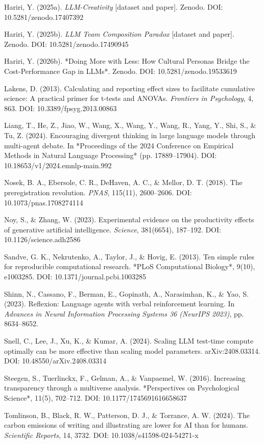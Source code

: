\documentclass[11pt,a4paper]{article}
\begin{document}
Hariri, Y. (2025a). \textit{LLM-Creativity} [dataset and paper]. Zenodo.
DOI: 10.5281/zenodo.17407392

Hariri, Y. (2025b). \textit{LLM Team Composition Paradox} [dataset and paper].
Zenodo. DOI: 10.5281/zenodo.17490945

Hariri, Y. (2026b). *Doing More with Less: How Cultural Personas Bridge the
Cost-Performance Gap in LLMs*. Zenodo. DOI: 10.5281/zenodo.19533619

Lakens, D. (2013). Calculating and reporting effect sizes to facilitate
cumulative science: A practical primer for t-tests and ANOVAs.
\textit{Frontiers in Psychology}, 4, 863.
DOI: 10.3389/fpsyg.2013.00863

Liang, T., He, Z., Jiao, W., Wang, X., Wang, Y., Wang, R., Yang, Y.,
Shi, S., \& Tu, Z. (2024). Encouraging divergent thinking in large language
models through multi-agent debate. In *Proceedings of the 2024 Conference on
Empirical Methods in Natural Language Processing* (pp. 17889–17904).
DOI: 10.18653/v1/2024.emnlp-main.992

Nosek, B. A., Ebersole, C. R., DeHaven, A. C., \& Mellor, D. T. (2018). The
preregistration revolution. \textit{PNAS}, 115(11), 2600–2606.
DOI: 10.1073/pnas.1708274114

Noy, S., \& Zhang, W. (2023). Experimental evidence on the productivity
effects of generative artificial intelligence. \textit{Science}, 381(6654),
187–192. DOI: 10.1126/science.adh2586

Sandve, G. K., Nekrutenko, A., Taylor, J., \& Hovig, E. (2013). Ten simple
rules for reproducible computational research. *PLoS Computational
Biology*, 9(10), e1003285. DOI: 10.1371/journal.pcbi.1003285

Shinn, N., Cassano, F., Berman, E., Gopinath, A., Narasimhan, K., \& Yao, S.
(2023). Reflexion: Language agents with verbal reinforcement learning.
In \textit{Advances in Neural Information Processing Systems 36 (NeurIPS 2023)},
pp. 8634–8652.

Snell, C., Lee, J., Xu, K., \& Kumar, A. (2024). Scaling LLM test-time
compute optimally can be more effective than scaling model parameters.
arXiv:2408.03314. DOI: 10.48550/arXiv.2408.03314

Steegen, S., Tuerlinckx, F., Gelman, A., \& Vanpaemel, W. (2016). Increasing
transparency through a multiverse analysis. *Perspectives on Psychological
Science*, 11(5), 702–712. DOI: 10.1177/1745691616658637

Tomlinson, B., Black, R. W., Patterson, D. J., \& Torrance, A. W. (2024).
The carbon emissions of writing and illustrating are lower for AI than for
humans. \textit{Scientific Reports}, 14, 3732.
DOI: 10.1038/s41598-024-54271-x
\end{document}
